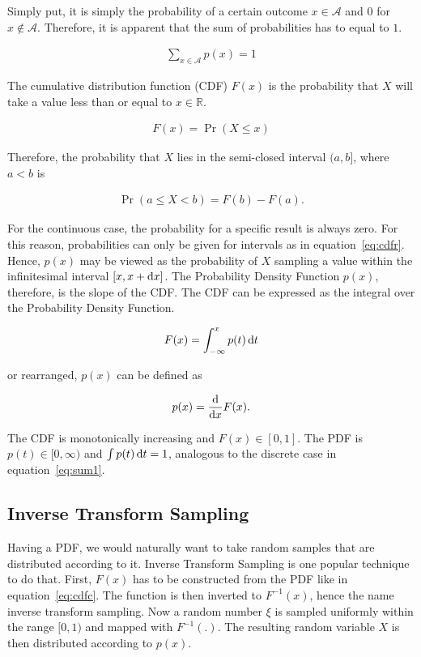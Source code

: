 Simply put, it is simply the probability of a certain outcome $x \in \mathcal{A}$ and $0$ for $x \notin \mathcal{A}$. Therefore, it is apparent that the sum of probabilities has to equal to $1$.

\begin{align}
\label{eq:sum1}
\sum_{x\in\mathcal{A}}p(x) = 1
\end{align}

The cumulative distribution function (CDF) $F(x)$ is the probability that $X$ will take a value less than or equal to $x \in \mathbb{R}$.

\begin{align}
 F(x) = \Pr(X \leq x)
\end{align}

Therefore, the probability that $X$ lies in the semi-closed interval $(a, b]$, where $a < b$ is  

\begin{align}
\label{eq:cdfr}
 \Pr(a \leq X < b) = F(b) - F(a).
\end{align}

For the continuous case, the probability for a specific result is always zero. For this reason, probabilities can only be given for intervals as in equation~\ref{eq:cdfr}. Hence, $p(x)$ may be viewed as the probability of $X$ sampling a value within the infinitesimal interval $[x, x + \mathop{}\!\mathrm{d} x]$. The Probability Density Function $p(x)$, therefore, is the slope of the CDF. The CDF can be expressed as the integral over the Probability Density Function.

\begin{align}
\label{eq:cdfc}
 F(x) = \int_{-\infty}^{x}p(t)\mathop{}\!\mathrm{d} t
\end{align}

or rearranged, $p(x)$ can be defined as

\begin{align}
 p(x) = \frac{\mathop{}\!\mathrm{d}}{\mathop{}\!\mathrm{d} x} F(x).
\end{align}

The CDF is monotonically increasing and $F(x) \in [0,1]$. The PDF is $p(t) \in [0, \infty)$ and $\int p(t)\mathop{}\!\mathrm{d} t = 1$, analogous to the discrete case in equation~\ref{eq:sum1}. 

\subsection{Inverse Transform Sampling}

Having a PDF, we would naturally want to take random samples that are distributed according to it. Inverse Transform Sampling is one popular technique to do that. First, $F(x)$ has to be constructed from the PDF like in equation~\ref{eq:cdfc}. The function is then inverted to $F^{-1}(x)$, hence the name inverse transform sampling. Now a random number $\xi$ is sampled uniformly within the range $[0, 1)$ and mapped with $F^{-1}(.)$. The resulting random variable $X$ is then distributed according to $p(x)$.

